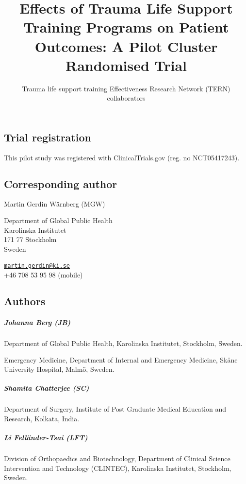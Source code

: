 \documentclass[
]{article}
\title{Effects of Trauma Life Support Training Programs on Patient Outcomes: A Pilot Cluster Randomised Trial}
\author{Trauma life support training Effectiveness Research Network (TERN) collaborators}
\date{}
\begin{document}
\maketitle

\hypertarget{trial-registration}{%
\subsection{Trial registration}\label{trial-registration}}

This pilot study was registered with ClinicalTrials.gov (reg. no NCT05417243).

\hypertarget{corresponding-author}{%
\subsection{Corresponding author}\label{corresponding-author}}

Martin Gerdin Wärnberg (MGW)

Department of Global Public Health\\
Karolinska Institutet\\
171 77 Stockholm\\
Sweden

\href{mailto:martin.gerdin@ki.se}{\nolinkurl{martin.gerdin@ki.se}}\\
+46 708 53 95 98 (mobile)

\hypertarget{authors}{%
\subsection{Authors}\label{authors}}

\hypertarget{johanna-berg-jb}{%
\subparagraph{Johanna Berg (JB)}\label{johanna-berg-jb}}

Department of Global Public Health, Karolinska Institutet, Stockholm, Sweden.

Emergency Medicine, Department of Internal and Emergency Medicine, Skåne University Hospital, Malmö, Sweden.

\hypertarget{shamita-chatterjee-sc}{%
\subparagraph{Shamita Chatterjee (SC)}\label{shamita-chatterjee-sc}}

Department of Surgery, Institute of Post Graduate Medical Education and Research, Kolkata, India.

\hypertarget{li-felluxe4nder-tsai-lft}{%
\subparagraph{Li Felländer-Tsai (LFT)}\label{li-felluxe4nder-tsai-lft}}

Division of Orthopaedics and Biotechnology, Department of Clinical Science Intervention and Technology (CLINTEC), Karolinska Institutet, Stockholm, Sweden.
\end{document}
